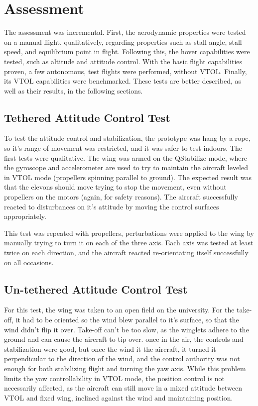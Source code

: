\chapter{Assessment} \label{chap:assessment}

The assessment was incremental. First, the aerodynamic properties were tested on a manual flight, qualitatively, regarding properties such as stall angle, stall speed, and equilibrium point in flight. Following this, the hover capabilities were tested, such as altitude and attitude control. With the basic flight capabilities proven, a few autonomous, test flights were performed, without VTOL. Finally, its VTOL capabilities were benchmarked. These tests are better described, as well as their results, in the following sections.


\section{Tethered Attitude Control Test}

To test the attitude control and stabilization, the prototype was hang by a rope, so it's range of movement was restricted, and it was safer to test indoors.
%
The first tests were qualitative. The wing was armed on the QStabilize mode, where the gyroscope and accelerometer are used to try to maintain the aircraft leveled in VTOL mode (propellers spinning parallel to ground).
%
The expected result was that the elevons should move trying to stop the movement, even without propellers on the motors (again, for safety reasons).
%
The aircraft successfully reacted to disturbances on it's attitude by moving the control surfaces appropriately.
% 

This test was repeated with propellers, perturbations were applied to the wing by manually trying to turn it on each of the three axis. 
%
Each axis was tested at least twice on each direction, and the aircraft reacted re-orientating itself successfully on all occasions.

\section{Un-tethered Attitude Control Test} 

For this test, the wing was taken to an open field on the university.
%
For the take-off, it had to be oriented so the wind blew parallel to it's surface, so that the wind didn't flip it over.
%
Take-off can't be too slow, as the winglets adhere to the ground and can cause the aircraft to tip over.
%
once in the air, the controls and stabilization were good, but once the wind it the aircraft, it turned it perpendicular to the direction of the wind, and the control authority was not enough for both stabilizing flight and turning the yaw axis.
%
While this problem limits the yaw controllability in VTOL mode, the position control is not necessarily affected, as the aircraft can still move in a mixed attitude between VTOL and fixed wing, inclined against the wind and maintaining position.
%

